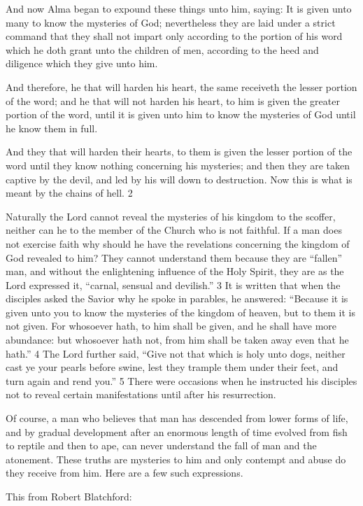 And now Alma began to expound these things unto him, saying: It is given unto many to
know the mysteries of God; nevertheless they are laid under a strict command that they shall
not impart only according to the portion of his word which he doth grant unto the children of
men, according to the heed and diligence which they give unto him.

And therefore, he that will harden his heart, the same receiveth the lesser portion of the word;
and he that will not harden his heart, to him is given the greater portion of the word, until it is
given unto him to know the mysteries of God until he know them in full.

And they that will harden their hearts, to them is given the lesser portion of the word until
they know nothing concerning his mysteries; and then they are taken captive by the devil,
and led by his will down to destruction. Now this is what is meant by the chains of hell. 2

Naturally the Lord cannot reveal the mysteries of his kingdom to the scoffer, neither can he
to the member of the Church who is not faithful. If a man does not exercise faith why should
he have the revelations concerning the kingdom of God revealed to him? They cannot
understand them because they are ``fallen'' man, and without the enlightening influence of the
Holy Spirit, they are as the Lord expressed it, ``carnal, sensual and devilish.'' 3 It is written
that when the disciples asked the Savior why he spoke in parables, he answered: ``Because it
is given unto you to know the mysteries of the kingdom of heaven, but to them it is not
given. For whosoever hath, to him shall be given, and he shall have more abundance: but
whosoever hath not, from him shall be taken away even that he hath.'' 4 The Lord further
said, ``Give not that which is holy unto dogs, neither cast ye your pearls before swine, lest
they trample them under their feet, and turn again and rend you.'' 5 There were occasions
when he instructed his disciples not to reveal certain manifestations until after his
resurrection.

Of course, a man who believes that man has descended from lower forms of life, and by
gradual development after an enormous length of time evolved from fish to reptile and then
to ape, can never understand the fall of man and the atonement. These truths are mysteries to
him and only contempt and abuse do they receive from him. Here are a few such expressions.

This from Robert Blatchford:

